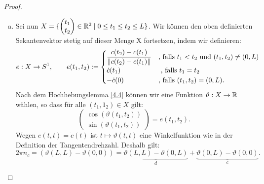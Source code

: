 \documentclass[11pt]{scrbook}
\newcommand{\tta}{\vartheta}
\begin{document}
\begin{st}[Umlaufsatz]
\begin{proof}
\begin{enumerate}[a)]
	\item
		Sei nun $X = \{ \begin{pmatrix} t_1 \\ t_2 \end{pmatrix} \in \mathbb{R}^2 \; | \; 0 \leq t_1 \leq t_2 \leq L \}$. Wir können den oben definierten Sekantenvektor stetig auf dieser Menge X fortsetzen, indem wir definieren: 
\[
e : X \to S^1 , \qquad e(t_1, t_2 ) := \begin{cases} 
					\displaystyle \frac{c(t_2) - c(t_1)}{\| c(t_2) - c(t_1) \|} & \text{, falls } t_1 < t_2 \text{ und } (t_1, t_2) \neq (0, L) \\
					\displaystyle \dot c(t_1) & \text{ , falls } t_1 = t_2 \\
					\displaystyle - \dot c(0)  & \text{, falls } (t_1, t_2) = (0, L). 
\end{cases}
\]
Nach dem Hochhebungslemma \ref{4.4} können wir eine Funktion $\tta: X \to \R$ wählen, so dass für alle $(t_1, 1_2) \in X$ gilt: 
\[ \begin{pmatrix} \cos(\tta(t_1, t_2)) \\ \sin(\tta(t_1, t_2)) \end{pmatrix} = e(t_1, t_2). \]
Wegen $e(t,t) = \dot c(t) $ ist $t \mapsto \tta(t, t)$ eine Winkelfunktion wie in der Definition der Tangentendrehzahl. Deshalb gilt: 
\[ 2 \pi n_c = (\tta(L,L) - \tta(0, 0)) = \underbrace{\tta(L, L) - \tta(0, L)}_d + \underbrace{\tta(0, L) - \tta(0, 0)}_c .\]


\end{enumerate}
\end{proof}
\end{st}
\end{document}
